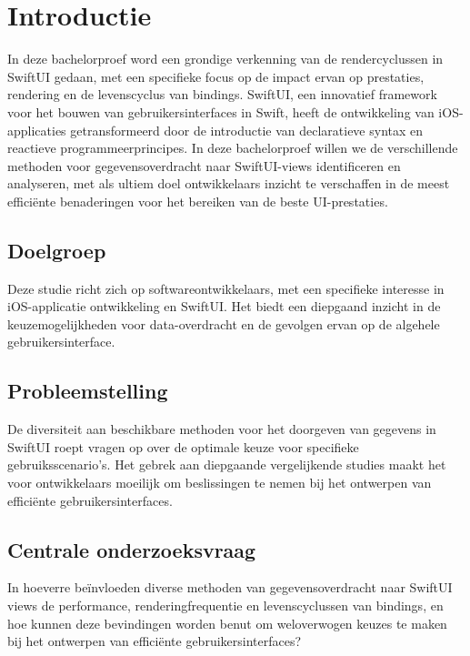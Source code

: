 
\section{Introductie}%
\label{sec:introductie}

In deze bachelorproef word een grondige verkenning van de rendercyclussen in SwiftUI gedaan, met een specifieke focus op de impact ervan op prestaties, rendering en de levenscyclus van bindings. SwiftUI, een innovatief framework voor het bouwen van gebruikersinterfaces in Swift, heeft de ontwikkeling van iOS-applicaties getransformeerd door de introductie van declaratieve syntax en reactieve programmeerprincipes. In deze bachelorproef willen we de verschillende methoden voor gegevensoverdracht naar SwiftUI-views identificeren en analyseren, met als ultiem doel ontwikkelaars inzicht te verschaffen in de meest efficiënte benaderingen voor het bereiken van de beste UI-prestaties.

\subsection{Doelgroep}
Deze studie richt zich op softwareontwikkelaars, met een specifieke interesse in iOS-applicatie ontwikkeling en SwiftUI. Het biedt een diepgaand inzicht in de keuzemogelijkheden voor data-overdracht en de gevolgen ervan op de algehele gebruikersinterface.

\subsection{Probleemstelling}
De diversiteit aan beschikbare methoden voor het doorgeven van gegevens in SwiftUI roept vragen op over de optimale keuze voor specifieke gebruiksscenario's. Het gebrek aan diepgaande vergelijkende studies maakt het voor ontwikkelaars moeilijk om beslissingen te nemen bij het ontwerpen van efficiënte gebruikersinterfaces.

\subsection{Centrale onderzoeksvraag}
In hoeverre beïnvloeden diverse methoden van gegevensoverdracht naar SwiftUI views de performance, renderingfrequentie en levenscyclussen van bindings, en hoe kunnen deze bevindingen worden benut om weloverwogen keuzes te maken bij het ontwerpen van efficiënte gebruikersinterfaces?

